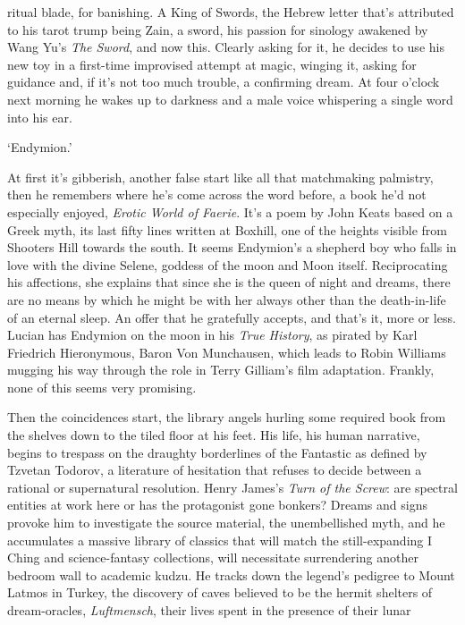 \documentclass[
]{article}
\begin{document}
ritual blade, for banishing. A King of Swords, the Hebrew letter that's
attributed to his tarot trump being Zain, a sword, his passion for
sinology awakened by Wang Yu's \emph{The Sword}, and now this. Clearly
asking for it, he decides to use his new toy in a first-time improvised
attempt at magic, winging it, asking for guidance and, if it's not too
much trouble, a confirming dream. At four o'clock next morning he wakes
up to darkness and a male voice whispering a single word into his ear. \par
`Endymion.' \par
At first it's gibberish, another false start like all that
matchmaking palmistry, then he remembers where he's come across the word
before, a book he'd not especially enjoyed, \emph{Erotic World of
Faerie}. It's a poem by John Keats based on a Greek myth, its last fifty
lines written at Boxhill, one of the heights visible from Shooters Hill
towards the south. It seems Endymion's a shepherd boy who falls in love
with the divine Selene, goddess of the moon and Moon itself.
Reciprocating his affections, she explains that since she is the queen
of night and dreams, there are no means by which he might be with her
always other than the death-in-life of an eternal sleep. An offer that
he gratefully accepts, and that's it, more or less. Lucian has Endymion
on the moon in his \emph{True History}, as pirated by Karl Friedrich
Hieronymous, Baron Von Munchausen, which leads to Robin Williams mugging
his way through the role in Terry Gilliam's film adaptation. Frankly,
none of this seems very promising. \par
Then the coincidences start, the library angels hurling some
required book from the shelves down to the tiled floor at his feet. His
life, his human narrative, begins to trespass on the draughty
borderlines of the Fantastic as defined by Tzvetan Todorov, a literature
of hesitation that refuses to decide between a rational or supernatural
resolution. Henry James's \emph{Turn of the Screw}: are spectral
entities at work here or has the protagonist gone bonkers? Dreams and
signs provoke him to investigate the source material, the unembellished
myth, and he accumulates a massive library of classics that will match
the still-expanding I Ching and science-fantasy collections, will
necessitate surrendering another bedroom wall to academic kudzu. He
tracks down the legend's pedigree to Mount Latmos in Turkey, the
discovery of caves believed to be the hermit shelters of dream-oracles,
\emph{Luftmensch}, their lives spent in the presence of their lunar
\end{document}
